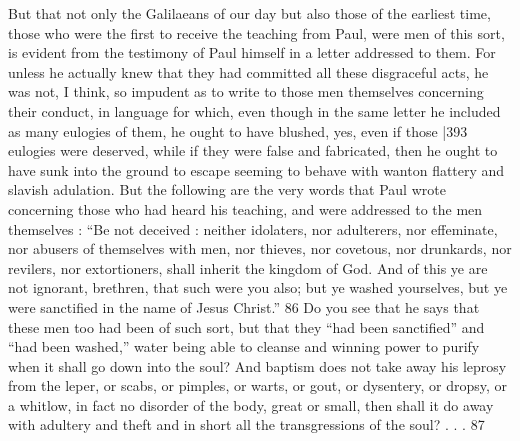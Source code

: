 But that not only the Galilaeans of our day but also those of the earliest time, those who were the first to receive the teaching from Paul, were men of this sort, is evident from the testimony of Paul himself in a letter addressed to them. For unless he actually knew that they had committed all these disgraceful acts, he was not, I think, so impudent as to write to those men themselves concerning their conduct, in language for which, even though in the same letter he included as many eulogies of them, he ought to have blushed, yes, even if those
|393 eulogies were deserved, while if they were false and fabricated, then he ought to have sunk into the ground to escape seeming to behave with wanton flattery and slavish adulation. But the following are the very words that Paul wrote concerning those who had heard his teaching, and were addressed to the men themselves : ``Be not deceived : neither idolaters, nor adulterers, nor effeminate, nor abusers of themselves with men, nor thieves, nor covetous, nor drunkards, nor revilers, nor extortioners, shall inherit the kingdom of God. And of this ye are not ignorant, brethren, that such were you also; but ye washed yourselves, but ye were sanctified in the name of Jesus Christ.''
86 Do you see that he says that these men too had been of such sort, but that they ``had been sanctified'' and ``had been washed,'' water being able to cleanse and winning power to purify when it shall go down into the soul? And baptism does not take away his leprosy from the leper, or scabs, or pimples, or warts, or gout, or dysentery, or dropsy, or a whitlow, in fact no disorder of the body, great or small, then shall it do away with adultery and theft and in short all the transgressions of the soul? . . . 87

